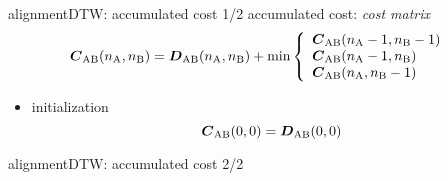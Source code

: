         \begin{frame}{alignment}{DTW: accumulated cost 1/2}
            accumulated cost: \textit{cost matrix}
                \begin{equation*}\label{eq:acccost}
                            \mat{C}_{\mathrm{AB}}(n_\mathrm{A},n_\mathrm{B}) = \mat{D}_{\mathrm{AB}}(n_\mathrm{A},n_\mathrm{B}) + \min\left\{
                                                    \begin{array}{llr} 
                                                        \mat{C}_{\mathrm{AB}}(n_\mathrm{A}-1, n_\mathrm{B}-1)\\
                                                        \mat{C}_{\mathrm{AB}}(n_\mathrm{A}-1, n_\mathrm{B}) \\
                                                        \mat{C}_{\mathrm{AB}}(n_\mathrm{A},	n_\mathrm{B}-1)
                                                    \end{array} 
                                                    \right. 
                \end{equation*}
                \begin{itemize}
                    \item	initialization
                        \begin{equation*}
                            \mat{C}_{\mathrm{AB}}(0,0) 	= \mat{D}_{\mathrm{AB}}(0,0) 
                        \end{equation*}
                \end{itemize}
                \begin{figure}
                    
                \end{figure}
        \end{frame}
        \begin{frame}{alignment}{DTW: accumulated cost 2/2}
            \vspace{-5mm}
        \end{frame}
